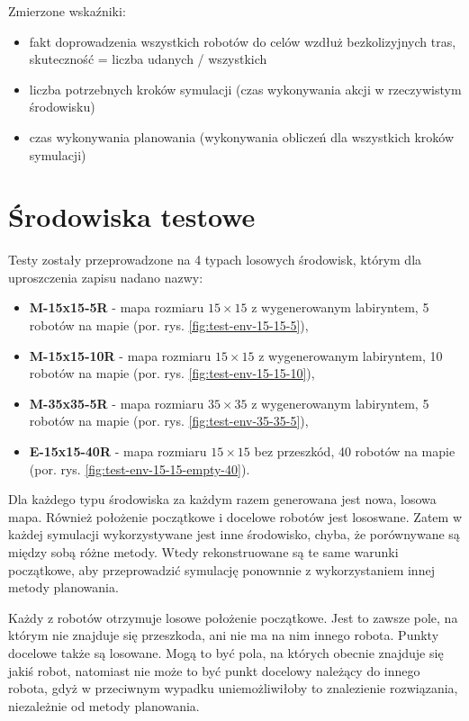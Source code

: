 Zmierzone wskaźniki:
\begin{itemize}
	\item fakt doprowadzenia wszystkich robotów do celów wzdłuż bezkolizyjnych tras, skuteczność = liczba udanych / wszystkich
	\item liczba potrzebnych kroków symulacji (czas wykonywania akcji w rzeczywistym środowisku)
	\item czas wykonywania planowania (wykonywania obliczeń dla wszystkich kroków symulacji)
\end{itemize}

\section{Środowiska testowe}
Testy zostały przeprowadzone na 4 typach losowych środowisk, którym dla uproszczenia zapisu nadano nazwy:
\begin{itemize}
	\item {\bf M-15x15-5R} - mapa rozmiaru $15 \times 15$ z wygenerowanym labiryntem, 5 robotów na mapie (por. rys. \ref{fig:test-env-15-15-5}),
	\item {\bf M-15x15-10R} - mapa rozmiaru $15 \times 15$ z wygenerowanym labiryntem, 10 robotów na mapie (por. rys. \ref{fig:test-env-15-15-10}),
	\item {\bf M-35x35-5R} - mapa rozmiaru $35 \times 35$ z wygenerowanym labiryntem, 5 robotów na mapie (por. rys. \ref{fig:test-env-35-35-5}),
	\item {\bf E-15x15-40R} - mapa rozmiaru $15 \times 15$ bez przeszkód, 40 robotów na mapie (por. rys. \ref{fig:test-env-15-15-empty-40}).
\end{itemize}
Dla każdego typu środowiska za każdym razem generowana jest nowa, losowa mapa. Również położenie początkowe i docelowe robotów jest lososwane. Zatem w każdej symulacji wykorzystywane jest inne środowisko, chyba, że porównywane są między sobą różne metody. Wtedy rekonstruowane są te same warunki początkowe, aby przeprowadzić symulację ponownnie z wykorzystaniem innej metody planowania.

Każdy z robotów otrzymuje losowe położenie początkowe. Jest to zawsze pole, na którym nie znajduje się przeszkoda, ani nie ma na nim innego robota.
Punkty docelowe także są losowane. Mogą to być pola, na których obecnie znajduje się jakiś robot, natomiast nie może to być punkt docelowy należący do innego robota, gdyż w przeciwnym wypadku uniemożliwiłoby to znalezienie rozwiązania, niezależnie od metody planowania.

